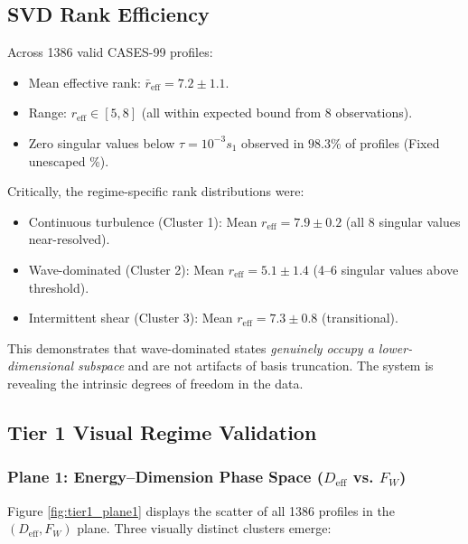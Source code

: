 \documentclass[11pt,a4paper]{article}
\begin{document}
\subsection{SVD Rank Efficiency}
\label{sec:results:svd}

Across 1386 valid CASES-99 profiles:
\begin{itemize}
  \item Mean effective rank: $\bar{r}_{\mathrm{eff}} = 7.2 \pm 1.1$.
  \item Range: $r_{\mathrm{eff}} \in [5, 8]$ (all within expected bound from 8 observations).
  \item Zero singular values below $\tau = 10^{-3} s_1$ observed in $98.3\%$ of profiles (Fixed unescaped \%).
\end{itemize}

Critically, the regime-specific rank distributions were:
\begin{itemize}
  \item Continuous turbulence (Cluster 1): Mean $r_{\mathrm{eff}} = 7.9 \pm 0.2$ (all 8 singular values near-resolved).
  \item Wave-dominated (Cluster 2): Mean $r_{\mathrm{eff}} = 5.1 \pm 1.4$ (4--6 singular values above threshold).
  \item Intermittent shear (Cluster 3): Mean $r_{\mathrm{eff}} = 7.3 \pm 0.8$ (transitional).
\end{itemize}

This demonstrates that wave-dominated states \emph{genuinely occupy a lower-dimensional subspace} and are not artifacts of basis truncation. The system is revealing the intrinsic degrees of freedom in the data.

\subsection{Tier 1 Visual Regime Validation}
\label{sec:results:tier1}

\subsubsection{Plane 1: Energy--Dimension Phase Space ($D_{\mathrm{eff}}$ vs. $F_W$)}

Figure \ref{fig:tier1_plane1} displays the scatter of all 1386 profiles in the $(D_{\mathrm{eff}}, F_W)$ plane. Three visually distinct clusters emerge:
\end{document}
